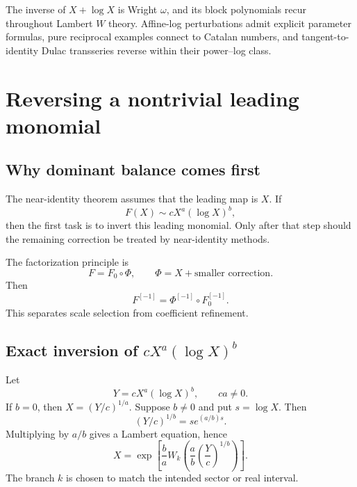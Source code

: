 \documentclass[11pt,openany]{book}
\theoremstyle{definition}
\theoremstyle{plain}
\theoremstyle{remark}
\newcommand{\invcomp}{^{[-1]}}
\begin{document}
\begin{summarybox}
The inverse of \(X+\log X\) is Wright \(\omega\), and its block polynomials recur throughout Lambert \(W\) theory. Affine-log perturbations admit explicit parameter formulas, pure reciprocal examples connect to Catalan numbers, and tangent-to-identity Dulac transseries reverse within their power--log class.
\end{summarybox}

\chapter{Reversing a nontrivial leading monomial}\label{ch:leading-reversion}

\section{Why dominant balance comes first}
The near-identity theorem assumes that the leading map is \(X\). If
\[
 F(X)\sim cX^a(\log X)^b,
\]
then the first task is to invert this leading monomial. Only after that step should the remaining correction be treated by near-identity methods.

The factorization principle is
\begin{equation}\label{eq:leading-factorization-composition}
 F=F_0\circ\Phi,
 \qquad \Phi=X+\text{smaller correction}.
\end{equation}
Then
\begin{equation}\label{eq:factorized-inverse}
 F\invcomp=\Phi\invcomp\circ F_0\invcomp.
\end{equation}
This separates scale selection from coefficient refinement.

\section{Exact inversion of \texorpdfstring{\(cX^a(\log X)^b\)}{a power-log leading monomial}}
Let
\begin{equation}\label{eq:powerlog-monomial}
 Y=cX^a(\log X)^b,
 \qquad ca\ne0.
\end{equation}
If \(b=0\), then \(X=(Y/c)^{1/a}\). Suppose \(b\ne0\) and put \(s=\log X\). Then
\[
 (Y/c)^{1/b}=s e^{(a/b)s}.
\]
Multiplying by \(a/b\) gives a Lambert equation, hence
\begin{equation}\label{eq:powerlog-inverse-W}
 X=
 \exp\left[
 \frac ba W_k\left(
 \frac ab\left(\frac Yc\right)^{1/b}
 \right)
 \right].
\end{equation}
The branch \(k\) is chosen to match the intended sector or real interval.
\end{document}
